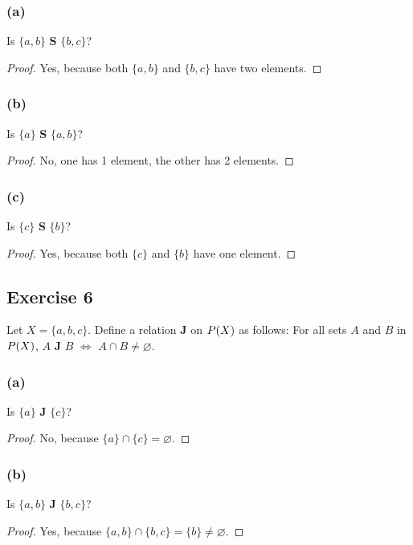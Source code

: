 \documentclass[14pt]{extarticle}
\let\mathscr\relax
\newcommand{\ps}{\mathscr{P}} %
\newcommand{\es}{\varnothing}
\begin{document}
\subsubsection{(a)}
Is \(\{a, b\}\) {\bf S} \(\{b, c\}\)?

\begin{proof}
        Yes, because both \(\{a, b\}\) and \(\{b, c\}\) have two elements.
\end{proof}

\subsubsection{(b)}
Is \(\{a\}\) {\bf S} \(\{a,b\}\)?

\begin{proof}
        No, one has 1 element, the other has 2 elements.
\end{proof}

\subsubsection{(c)}
Is \(\{c\}\) {\bf S} \(\{b\}\)?

\begin{proof}
        Yes, because both \(\{c\}\) and \(\{b\}\) have one element.
\end{proof}

\subsection{Exercise 6}
Let \(X = \{a, b, c\}\). Define a relation {\bf J} on \(\ps(X)\) as follows: For all sets $A$ and $B$ in $\ps(X)$,
$A$ {\bf J} $B$ $\iff$ \(A \cap B \neq \es\).

\subsubsection{(a)}
Is $\{a\}$ {\bf J} $\{c\}$?

\begin{proof}
        No, because \(\{a\} \cap \{c\} = \es\).
\end{proof}

\subsubsection{(b)}
Is $\{a, b\}$ {\bf J} $\{b, c\}$?

\begin{proof}
        Yes, because \(\{a,b\} \cap \{b,c\} = \{b\} \neq \es\).
\end{proof}
\end{document}
